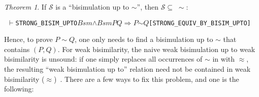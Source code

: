 \documentclass[GCNS]{yincog}
\renewcommand{\HOLConst}[1]{\texttt{#1}}
\renewcommand{\HOLFreeVar}[1]{\ensuremath{\mathit{#1}}}
\renewcommand{\HOLSymConst}[1]{#1}
\renewcommand{\HOLTokenConj}{\ensuremath{\wedge}}
\renewcommand{\HOLTokenTurnstile}{\ensuremath{\:\:\vdash}}
\theoremstyle{remark}
\theoremstyle{theorem}
\newtheorem{theorem}[definition]{Theorem}
\theoremstyle{remark}
\newcommand{\HOLTokenStrongEQ}{$\sim$}
\renewcommand{\HOLTokenImp}{\ensuremath{\Longrightarrow}}
\newcommand{\wbvtex}{\approx}
\begin{document}
\begin{theorem}
If $\mathcal{S}$ is a ``bisimulation up to $\sim $'', then
$\mathcal{S} \subseteq \;\sim $:
%
\begin{alltt}
\HOLTokenTurnstile{} \HOLConst{STRONG\_BISIM\_UPTO} \HOLFreeVar{Bsm} \HOLSymConst{\HOLTokenConj{}} \HOLFreeVar{Bsm} \HOLFreeVar{P} \HOLFreeVar{Q} \HOLSymConst{\HOLTokenImp{}} \HOLFreeVar{P} \HOLSymConst{\HOLTokenStrongEQ} \HOLFreeVar{Q}\hfill{[STRONG\_EQUIV\_BY\_BISIM\_UPTO]}
\end{alltt}
%
\end{theorem}
%
Hence, to prove $P \sim Q$, one only needs to find a bisimulation up to
$\sim $ that contains $(P, Q)$. For weak bisimilarity, the naive weak bisimulation
up to weak bisimilarity is unsound: if one simply replaces all occurrences
of $\sim $ in  with $\wbvtex $, the resulting
``weak bisimulation up to'' relation need not be contained in weak bisimilarity
($\wbvtex $)~\cite{PoSa2019}. There are a few ways to fix this problem,
and one is the following:
%
\end{document}
